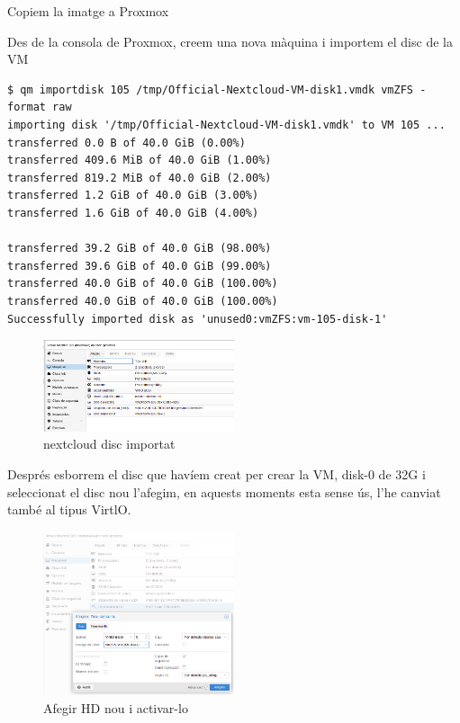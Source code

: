 \documentclass[
  10pt,
]{krantz}
\newenvironment{Shaded}{\begin{snugshade}}{\end{snugshade}}
\newcommand{\ExtensionTok}[1]{#1}
\newcommand{\NormalTok}[1]{#1}
\newcommand{\StringTok}[1]{\textcolor[rgb]{0.31,0.60,0.02}{#1}}
\begin{document}
Copiem la imatge a Proxmox

\begin{Shaded}
\end{Shaded}

Des de la consola de Proxmox, creem una nova màquina i importem el disc de la VM

\begin{verbatim}
$ qm importdisk 105 /tmp/Official-Nextcloud-VM-disk1.vmdk vmZFS -format raw
importing disk '/tmp/Official-Nextcloud-VM-disk1.vmdk' to VM 105 ...
transferred 0.0 B of 40.0 GiB (0.00%)
transferred 409.6 MiB of 40.0 GiB (1.00%)
transferred 819.2 MiB of 40.0 GiB (2.00%)
transferred 1.2 GiB of 40.0 GiB (3.00%)
transferred 1.6 GiB of 40.0 GiB (4.00%)

transferred 39.2 GiB of 40.0 GiB (98.00%)
transferred 39.6 GiB of 40.0 GiB (99.00%)
transferred 40.0 GiB of 40.0 GiB (100.00%)
transferred 40.0 GiB of 40.0 GiB (100.00%)
Successfully imported disk as 'unused0:vmZFS:vm-105-disk-1'
\end{verbatim}

\begin{figure}
\centering
\includegraphics[width=0.5\textwidth,height=\textheight]{imatges/proxmox/nextcloud_import_hd.png}
\caption{nextcloud disc importat}
\end{figure}

Després esborrem el disc que havíem creat per crear la VM, disk-0 de 32G i seleccionat el disc nou l'afegim, en aquests moments esta sense ús, l'he canviat també al tipus VirtlO.

\begin{figure}
\centering
\includegraphics[width=0.5\textwidth,height=\textheight]{imatges/proxmox/afegir_hd_nou.png}
\caption{Afegir HD nou i activar-lo}
\end{figure}
\end{document}
